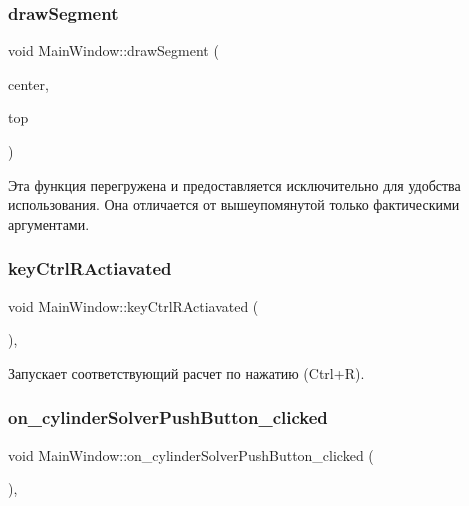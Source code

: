 \subsubsection{\texorpdfstring{draw\+Segment}{drawSegment}}
{\footnotesize\ttfamily void Main\+Window\+::draw\+Segment (\begin{DoxyParamCaption}\item[{Q\+Vector3D}]{center,  }\item[{Q\+Vector3D}]{top }\end{DoxyParamCaption})\hspace{0.3cm}{\ttfamily [signal]}}

Эта функция перегружена и предоставляется исключительно для удобства использования. Она отличается от вышеупомянутой только фактическими аргументами. \mbox{\label{class_main_window_a73c60b914a2a815b17925c105f4e518c}} 
\subsubsection{\texorpdfstring{key\+Ctrl\+R\+Actiavated}{keyCtrlRActiavated}}
{\footnotesize\ttfamily void Main\+Window\+::key\+Ctrl\+R\+Actiavated (\begin{DoxyParamCaption}{ }\end{DoxyParamCaption})\hspace{0.3cm}{\ttfamily [private]}, {\ttfamily [slot]}}

Запускает соответствующий расчет по нажатию (Ctrl+R). \mbox{\label{class_main_window_ae7c0fbd49598e38f87c58b1e8e8eeb03}} 
\subsubsection{\texorpdfstring{on\+\_\+cylinder\+Solver\+Push\+Button\+\_\+clicked}{on\_cylinderSolverPushButton\_clicked}}
{\footnotesize\ttfamily void Main\+Window\+::on\+\_\+cylinder\+Solver\+Push\+Button\+\_\+clicked (\begin{DoxyParamCaption}{ }\end{DoxyParamCaption})\hspace{0.3cm}{\ttfamily [private]}, {\ttfamily [slot]}}

